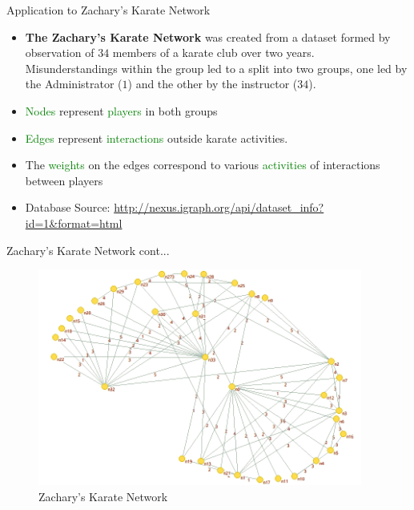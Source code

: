 \documentclass{beamer}
\begin{document}
\begin{frame}{Application to Zachary's Karate Network}
		\begin{itemize}
		\item \textbf{The Zachary's Karate Network} was created from a dataset formed by observation of $34$ members of a karate club over two years. Misunderstandings within the group led to a split into two groups, one led by the Administrator ($1$) and the other by the instructor ($34$).
		\vspace{0.2cm}
		\pause
		\item \textcolor{green}{Nodes} represent \textcolor{green} {players} in both groups 
		\item \textcolor{green}{Edges} represent \textcolor{green}{interactions} outside karate activities.
		\vspace{0.2cm}
		\pause
		\item The \textcolor{green}{weights} on the edges correspond to various \textcolor{green}{activities} of interactions between players
		\vspace{0.2cm}
		\pause
		\item Database Source:
		 \url{http://nexus.igraph.org/api/dataset_info?id=1&format=html}
		
		\end{itemize}
		
\end{frame}

\begin{frame}{Zachary's Karate Network cont...}
	\begin{figure}[!h]
		\centering
			\includegraphics[width=0.95\textwidth]{images/zachvisual.png}
			\caption{Zachary's Karate Network}
	\end{figure}
\end{frame}
\end{document}
